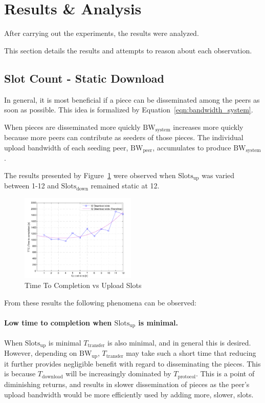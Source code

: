 \documentclass[a4paper,12pt,twocolumn]{article}
\newcommand{\fref}[1]{Figure~\ref{#1}}
\newcommand{\eref}[1]{Equation~\ref{#1}}
\begin{document}
\section{Results \& Analysis}
\label{sec:results_analysis}

After carrying out the experiments, the results were analyzed.

This section details the results and attempts to reason about each observation.

\subsection{Slot Count - Static Download}
\label{subsec:slots_results_static_download}

In general, it is most beneficial if a piece can be disseminated among the peers as soon as possible. This idea is formalized by \eref{eqn:bandwidth_system}.

When pieces are disseminated more quickly $\text{BW}_{\text{system}}$ increases more quickly because more peers can contribute as seeders of those pieces. The individual upload bandwidth of each seeding peer, $\text{BW}_{\text{peer}}$, accumulates to produce $\text{BW}_{\text{system}}$.

The results presented by \fref{fig:slots_static_download} were observed when $\text{Slots}_{\text{up}}$ was varied between 1-12 and $\text{Slots}_{\text{down}}$ remained static at 12. 

\begin{figure}[!htbp]
  \centering
  \includegraphics[width=0.49\textwidth]{figs/Experiment1_D12_TTC}
  \caption{Time To Completion vs Upload Slots}
  \label{fig:slots_static_download}
\end{figure}

From these results the following phenomena can be observed:

\paragraph{Low time to completion when $\text{Slots}_{\text{up}}$ is minimal.} When $\text{Slots}_{\text{up}}$ is minimal $T_{\text{transfer}}$ is also minimal, and in general this is desired. However, depending on $\text{BW}_{\text{up}}$, $T_{\text{transfer}}$ may take such a short time that reducing it further provides negligible benefit with regard to disseminating the pieces. This is because $T_{\text{download}}$ will be increasingly dominated by $T_{\text{protocol}}$. 
This is a point of diminishing returns, and results in slower dissemination of pieces as the peer's upload bandwidth would be more efficiently used by adding more, slower, slots.
\end{document}
